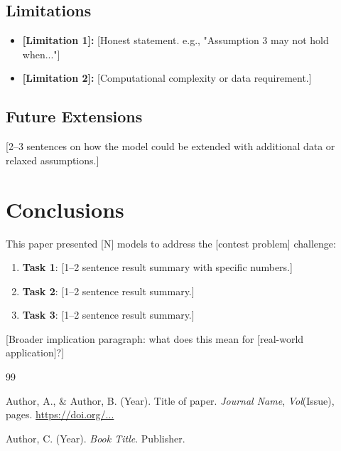 \documentclass{mcmthesis}
\begin{document}
\subsection{Limitations}
\begin{itemize}
    \item \textbf{[Limitation 1]:} [Honest statement. e.g., "Assumption 3 may not hold when..."]
    \item \textbf{[Limitation 2]:} [Computational complexity or data requirement.]
\end{itemize}

\subsection{Future Extensions}

[2–3 sentences on how the model could be extended with additional data or relaxed assumptions.]

\section{Conclusions}

This paper presented [N] models to address the [contest problem] challenge:

\begin{enumerate}
    \item \textbf{Task 1}: [1–2 sentence result summary with specific numbers.]
    \item \textbf{Task 2}: [1–2 sentence result summary.]
    \item \textbf{Task 3}: [1–2 sentence result summary.]
\end{enumerate}

[Broader implication paragraph: what does this mean for [real-world application]?]


\begin{thebibliography}{99}

Author, A., \& Author, B. (Year). Title of paper. \textit{Journal Name}, \textit{Vol}(Issue), pages. \url{https://doi.org/...}

Author, C. (Year). \textit{Book Title}. Publisher.


\end{thebibliography}
\end{document}
